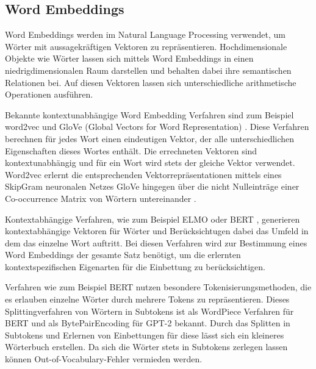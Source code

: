 \subsection{Word Embeddings}
Word Embeddings werden im Natural Language Processing verwendet, um Wörter mit aussagekräftigen Vektoren zu repräsentieren. 
Hochdimensionale Objekte wie Wörter lassen sich mittels Word Embeddings in einen niedrigdimensionalen Raum darstellen und behalten dabei ihre semantischen Relationen bei. 
Auf diesen Vektoren lassen sich unterschiedliche arithmetische Operationen ausführen.

Bekannte kontextunabhängige Word Embedding Verfahren sind zum Beispiel word2vec \citep{word2vec} und GloVe (Global Vectors for Word Representation) \citep{glove}. 
Diese Verfahren berechnen für jedes Wort einen eindeutigen Vektor, der alle unterschiedlichen Eigenschaften dieses Wortes enthält.
Die errechneten Vektoren sind kontextunabhängig und für ein Wort wird stets der gleiche Vektor verwendet. 
Word2vec erlernt die entsprechenden Vektorrepräsentationen mittels eines SkipGram neuronalen Netzes \citep{word2vec} GloVe hingegen über die nicht Nulleinträge einer Co-occurrence Matrix von Wörtern untereinander \citep{glove}. 

Kontextabhängige Verfahren, wie zum Beispiel ELMO \citep{elmo} oder BERT \citep{DBLP:journals/corr/abs-1810-04805}, generieren kontextabhängige Vektoren für Wörter und Berücksichtugen dabei das Umfeld in dem das einzelne Wort auftritt.
Bei diesen Verfahren wird zur Bestimmung eines Word Embeddings der gesamte Satz benötigt, um die erlernten kontextspezifischen Eigenarten für die Einbettung zu berücksichtigen. 

Verfahren wie zum Beispiel BERT nutzen besondere Tokenisierungsmethoden, die es erlauben einzelne Wörter durch mehrere Tokens zu repräsentieren.
Dieses Splittingverfahren von Wörtern in Subtokens ist als WordPiece Verfahren \citep{wordpiece} für BERT und als BytePairEncoding \citep{bytepairencoding} für GPT-2 bekannt. 
Durch das Splitten in Subtokens und Erlernen von Einbettungen für diese lässt sich ein kleineres Wörterbuch erstellen. 
Da sich die Wörter stets in Subtokens zerlegen lassen können Out-of-Vocabulary-Fehler vermieden werden.

